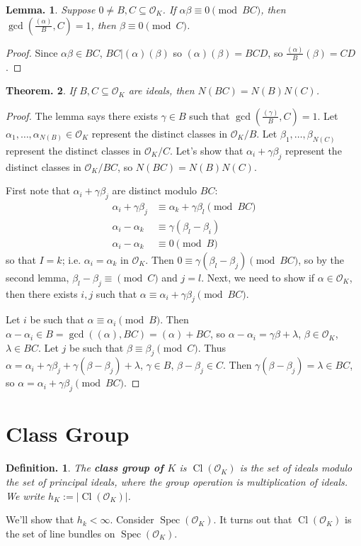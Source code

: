 \documentclass[11pt, a4paper]{memoir}
\theoremstyle{change}
\newtheorem{theorem}{Theorem.}[section]
\newtheorem{lemma}[theorem]{Lemma.}
\theoremstyle{plain}
\theoremstyle{nonumberplain}
\newtheorem{definition}{Definition.}
\newtheorem{proof}{Proof}
\DeclareMathOperator{\Spec}{Spec}
\DeclareMathOperator{\Cl}{Cl}
\begin{document}
\begin{lemma}
    Suppose $0\neq B,C\subseteq\mathcal{O}_K$.
    If $\alpha\beta\equiv 0\pmod{BC}$, then $\gcd\left(\frac{(\alpha)}{B},C\right)=1$, then $\beta\equiv 0\pmod{C}$.
\end{lemma}
\begin{proof}
    Since $\alpha\beta\in BC$, $BC|(\alpha)(\beta)$ so $(\alpha)(\beta)=BCD$, so $\frac{(\alpha)}{B}(\beta)=CD$.
\end{proof}
\begin{theorem}
    If $B,C\subseteq\mathcal{O}_K$ are ideals, then $N(BC)=N(B)N(C)$.
\end{theorem}
\begin{proof}
    The lemma says there exists $\gamma\in B$ such that $\gcd\left(\frac{(\gamma)}{B},C\right)=1$.
    Let $\alpha_1,\ldots,\alpha_{N(B)}\in\mathcal{O}_K$ represent the distinct classes in $\mathcal{O}_K/B$.
    Let $\beta_1,\ldots,\beta_{N(C)}$ represent the distinct classes in $\mathcal{O}_K/C$.
    Let's show that $\alpha_i+\gamma\beta_j$ represent the distinct classes in $\mathcal{O}_K/BC$, so $N(BC)=N(B)N(C)$.

    First note that $\alpha_i+\gamma\beta_j$ are distinct modulo $BC$:
    \begin{align*}
        \alpha_i+\gamma\beta_j &\equiv\alpha_k+\gamma\beta_l\pmod{BC}\\
        \alpha_i-\alpha_k &\equiv\gamma(\beta_l-\beta_i)\\
        \alpha_i-\alpha_k &\equiv 0\pmod{B}
    \end{align*}
    so that $I=k$; i.e. $\alpha_i=\alpha_k$ in $\mathcal{O}_K$.
    Then $0\equiv\gamma(\beta_l-\beta_j)\pmod{BC}$, so by the second lemma, $\beta_l-\beta_j\equiv \pmod{C}$ and $j=l$.
    Next, we need to show if $\alpha\in\mathcal{O}_K$, then there exists $i,j$ such that $\alpha\equiv\alpha_i+\gamma\beta_j\pmod{BC}$.

    Let $i$ be such that $\alpha\equiv\alpha_i\pmod{B}$.
    Then $\alpha-\alpha_i\in B=\gcd((\alpha),BC)=(\alpha)+BC$, so $\alpha-\alpha_i=\gamma\beta+\lambda$, $\beta\in\mathcal{O}_K$, $\lambda\in BC$.
    Let $j$ be such that $\beta\equiv\beta_j\pmod{C}$.
    Thus $\alpha=\alpha_i+\gamma\beta_j+\gamma(\beta-\beta_j)+\lambda$, $\gamma\in B$, $\beta-\beta_j\in C$.
    Then $\gamma(\beta-\beta_j)=\lambda\in BC$, so $\alpha=\alpha_i+\gamma\beta_j\pmod{BC}$.
\end{proof}
\section{Class Group}
\begin{definition}
    The \textbf{class group of $K$} is $\Cl(\mathcal{O}_K)$ is the set of ideals modulo the set of principal ideals, where the group operation is multiplication of ideals.
    We write $h_K:=|\Cl(\mathcal{O}_K)|$.
\end{definition}
We'll show that $h_k<\infty$.
Consider $\Spec(\mathcal{O}_K)$.
It turns out that $\Cl(\mathcal{O}_K)$ is the set of line bundles on $\Spec(\mathcal{O}_K)$.
\end{document}
